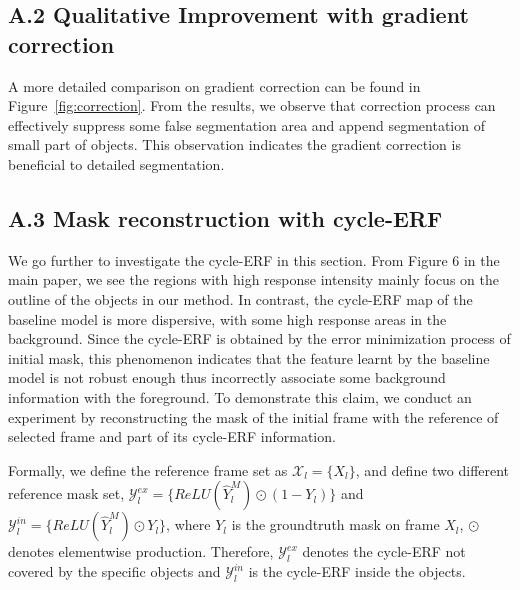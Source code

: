 \documentclass{article}
\begin{document}
\subsection*{A.2 Qualitative Improvement with gradient correction}
A more detailed comparison on gradient correction can be found in Figure~\ref{fig:correction}. From the results, we observe that correction process can effectively suppress some false segmentation area and append segmentation of small part of objects. This observation indicates the gradient correction is beneficial to detailed segmentation.

\subsection*{A.3 Mask reconstruction with cycle-ERF}

We go further to investigate the cycle-ERF in this section. From Figure 6 in the main paper, we see the regions with high response intensity mainly focus on the outline of the objects in our method. In contrast, the cycle-ERF map of the baseline model is more dispersive, with some high response areas in the background. Since the cycle-ERF is obtained by the error minimization process of initial mask, this phenomenon indicates that the feature learnt by the baseline model is not robust enough thus incorrectly associate some background information with the foreground. To demonstrate this claim, we conduct an experiment by reconstructing the mask of the initial frame with the reference of selected frame and part of its cycle-ERF information.

Formally, we define the reference frame set as $\mathcal{X}_l=\{X_l\}$, and define two different reference mask set, $\mathcal{Y}^{ex}_{l}=\{ReLU(\widehat{Y}^M_l) \odot (1-Y_l)\}$ and $\mathcal{Y}^{in}_{l}=\{ReLU(\widehat{Y}^M_l)\odot Y_l\}$, where $Y_l$ is the groundtruth mask on frame $X_l$, $\odot$ denotes elementwise production. Therefore, $\mathcal{Y}^{ex}_{l}$ denotes the cycle-ERF not covered by the specific objects and  $\mathcal{Y}^{in}_{l}$ is the cycle-ERF inside the objects.
\end{document}
